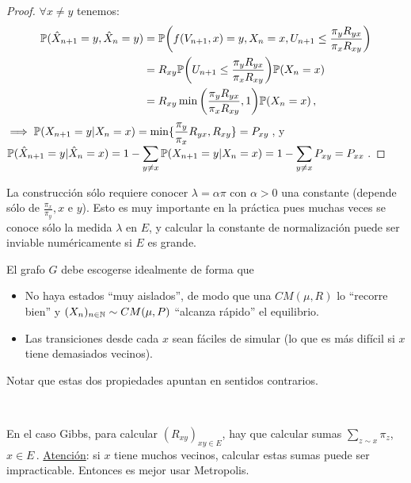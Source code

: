 \begin{proof}
\gris
$\forall x\neq y$ tenemos:
\begin{alignat*}{2}
    \P(\xhat_{n+1}=y,\xhat_{n}=y) & = \P\bigg(f(V_{n+1},x)=y,X_n=x,U_{n+1}\leq \displaystyle\frac{\pi_y R_{yx}}{\pi_x R_{xy}}\bigg) \\
     & = R_{xy}\P\bigg(U_{n+1}\leq \frac{\pi_y R_{yx}}{\pi_x R_{xy}}\bigg)\P(X_n=x)\\
     & = R_{xy}\min\bigg(\frac{\pi_y R_{yx}}{\pi_x R_{xy}},1\bigg)\P(X_n=x) \,,
\end{alignat*}
$\implies \P(X_{n+1}=y| X_n=x)=\displaystyle\min\{\frac{\pi_y}{\pi_x}R_{yx},R_{xy}\}=P_{xy}$\,,
\newline y $\P(\xhat_{n+1}=y|\xhat_{n}=x)=1-\displaystyle\sum_{y\neq x}\P(X_{n+1}=y|X_n=x)=1-\sum_{y\neq x}P_{xy}=P_{xx}$\,. \findem
\negro
\end{proof}
\begin{remark}
La construcción sólo requiere conocer $\lambda = \alpha \pi$ con $\alpha>0$ una constante (depende sólo de $\displaystyle \frac{\pi_x}{\pi_y},x$ e $y$). %
Esto es muy importante en la práctica pues muchas veces se conoce sólo la medida $\lambda$ en $E$, y calcular la constante de normalización puede ser inviable numéricamente si $E$ es grande.
\end{remark}
\begin{remark}
El grafo $G$ debe escogerse idealmente de forma que
\begin{itemize}
    \item No haya estados ``muy aislados'', de modo que una $CM(\mu,R)$ lo ``recorre bien'' y $(X_n)_{n\in\N}\sim CM(\mu,P)$ ``alcanza rápido'' el equilibrio.
    \item Las transiciones desde cada $x$ sean fáciles de simular (lo que es m\'as difícil si $x$ tiene demasiados vecinos).
\end{itemize}
Notar que estas dos propiedades apuntan  en sentidos contrarios.
\end{remark}
\vspace{.5cm} \\ %
\begin{remark}  %
En el caso Gibbs,  para calcular $(R_{xy})_{xy\in E}$, hay que calcular sumas $\sum_{z\sim x}\pi_z$, $x\in E$\,.
    \newline \underline{Atención}: si $x$ tiene muchos vecinos, calcular estas sumas puede ser impracticable. Entonces es mejor usar Metropolis.
\end{remark}

